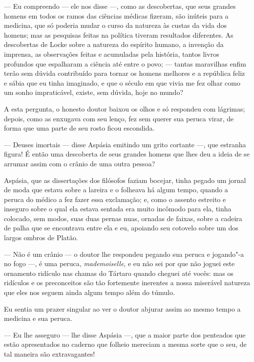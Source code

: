  --- Eu compreendo --- ele nos disse ---, como as descobertas, que seus
grandes homens em todos os ramos das ciências médicas fizeram, são
inúteis para a medicina, que só poderia mudar o curso da natureza às
custas da vida dos homens; mas as pesquisas feitas na política tiveram
resultados diferentes. As descobertas de Locke sobre a natureza do
espírito humano, a invenção da imprensa, as observações feitas e
acumuladas pela história, tantos livros profundos que espalharam a
ciência até entre o povo; --- tantas maravilhas enfim terão sem dúvida
contribuído para tornar os homens melhores e a república feliz e sábia
que eu tinha imaginado, e que o século em que vivia me fez olhar como
um sonho impraticável, existe, sem dúvida, hoje no mundo?

 A esta pergunta, o honesto doutor baixou os olhos e só respondeu com
lágrimas; depois, como as enxugava com seu lenço, fez sem querer sua
peruca virar, de forma que uma parte de seu rosto ficou escondida.

 --- Deuses imortais --- disse Aspásia emitindo um grito cortante ---,
que estranha figura! É então uma descoberta de seus grandes homens que
lhes deu a ideia de se arrumar assim com o crânio de uma outra pessoa?

 Aspásia, que as dissertações dos filósofos faziam bocejar, tinha pegado
um jornal de moda que estava sobre a lareira e o folheava há algum
tempo, quando a peruca do médico a fez fazer essa exclamação; e, como o
assento estreito e inseguro sobre o qual ela estava sentada era muito
incômodo para ela, tinha colocado, sem modos, suas duas pernas nuas,
ornadas de faixas, sobre a cadeira de palha que se encontrava entre ela
e eu, apoiando seu cotovelo sobre um dos largos ombros de Platão.

 --- Não é um crânio --- o doutor lhe respondeu pegando sua peruca e
jogando"-a no fogo ---, é uma peruca, \textit{mademoiselle}, e eu não
sei por que não joguei este ornamento ridículo nas chamas do Tártaro
quando cheguei até vocês: mas os ridículos e os preconceitos são tão
fortemente inerentes a nossa miserável natureza que eles nos seguem
ainda algum tempo além do túmulo.

 Eu sentia um prazer singular ao ver o doutor abjurar assim ao mesmo
tempo a medicina e sua peruca.

 --- Eu lhe asseguro --- lhe disse Aspásia ---, que a maior parte dos
penteados que estão apresentados no caderno que folheio mereciam a
mesma sorte que o seu, de tal maneira são extravagantes!

